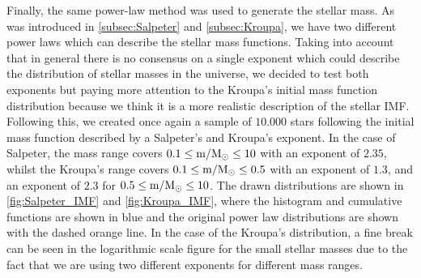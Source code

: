 Finally, the same power-law method was used to generate the stellar mass. As was introduced in \autoref{subsec:Salpeter} and \autoref{subsec:Kroupa}, we have two different power laws which can describe the stellar mass functions. Taking into account that in general there is no consensus on a single exponent which could describe the distribution of stellar masses in the universe, we decided to test both exponents but paying more attention to the Kroupa's initial mass function distribution because we think it is a more realistic description of the stellar IMF. Following this, we created once again a sample of $10.000$ stars following the initial mass function described by a Salpeter's and Kroupa's exponent. In the case of Salpeter, the mass range covers  $0.1 \leq \textnormal{m/M$_\odot$} \leq 10$ with an exponent of $2.35$, whilst the Kroupa's range covers $0.1 \leq \textnormal{m/M$_\odot$} \leq 0.5$ with an exponent of $1.3$, and an exponent of $2.3$ for $0.5 \leq \textnormal{m/M$_\odot$} \leq 10$. The drawn distributions are shown in \autoref{fig:Salpeter_IMF} and \autoref{fig:Kroupa_IMF}, where the histogram and cumulative functions are shown in blue and the original power law distributions are shown with the dashed orange line. In the case of the Kroupa's distribution, a fine break can be seen in the logarithmic scale figure for the small stellar masses due to the fact that we are using two different exponents for different mass ranges.\\  

